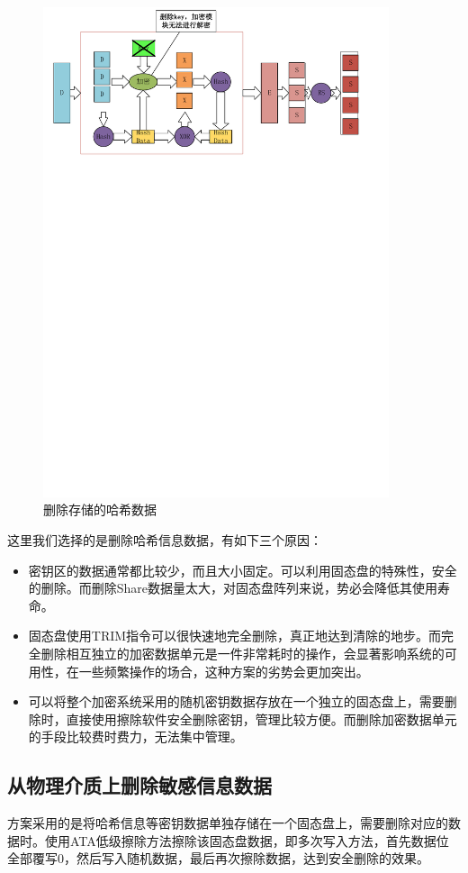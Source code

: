 \begin{figure}[H]
	\centering
	\includegraphics[width=4in]{Pics/del-hashkey.pdf}
	\caption{删除存储的哈希数据}\label{fig:7}
\end{figure}


这里我们选择的是删除哈希信息数据，有如下三个原因：
\begin{itemize}
	\item 密钥区的数据通常都比较少，而且大小固定。可以利用固态盘的特殊性，安全的删除。而删除Share数据量太大，对固态盘阵列来说，势必会降低其使用寿命。
	\item 固态盘使用TRIM指令可以很快速地完全删除，真正地达到清除的地步。而完全删除相互独立的加密数据单元是一件非常耗时的操作，会显著影响系统的可用性，在一些频繁操作的场合，这种方案的劣势会更加突出。
	\item 可以将整个加密系统采用的随机密钥数据存放在一个独立的固态盘上，需要删除时，直接使用擦除软件安全删除密钥，管理比较方便。而删除加密数据单元的手段比较费时费力，无法集中管理。
\end{itemize}

\subsection{从物理介质上删除敏感信息数据}
方案采用的是将哈希信息等密钥数据单独存储在一个固态盘上，需要删除对应的数据时。使用ATA低级擦除方法擦除该固态盘数据，即多次写入方法，首先数据位全部覆写0，然后写入随机数据，最后再次擦除数据，达到安全删除的效果\cite{Lee2008Secure,Swanson2010Safe}。
